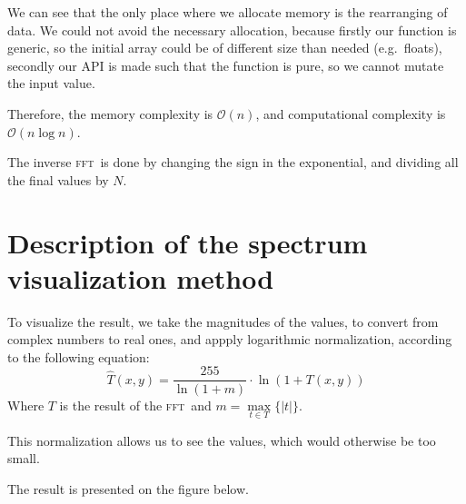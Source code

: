 \documentclass[12pt]{article}
\newcommand*{\fft}{\textsc{fft}}
\begin{document}
We can see that the only place where we allocate memory is the rearranging of data.
We could not avoid the necessary allocation, because firstly our function is generic, so the initial array could be of different size than needed (e.g.~floats), secondly our API is made such that the function is pure, so we cannot mutate the input value.

Therefore, the memory complexity is $\mathcal{O}(n)$, and computational complexity is $\mathcal{O}(n \log n)$.

The inverse \fft\ is done by changing the sign in the exponential, and dividing all the final values by $N$.

\section{Description of the spectrum visualization method}

To visualize the result, we take the magnitudes of the values, to convert from complex numbers to real ones, and appply logarithmic normalization, according to the following equation:
\begin{equation}
    \hat{T}(x,y) = \frac{255}{\ln(1 + m)} \cdot \ln (1 + T(x,y))
\end{equation}
Where $T$ is the result of the \fft\, and $m = \max\limits_{t \in T}\big\{|t|\big\}$.

This normalization allows us to see the values, which would otherwise be too small.

The result is presented on the figure below.
\end{document}
